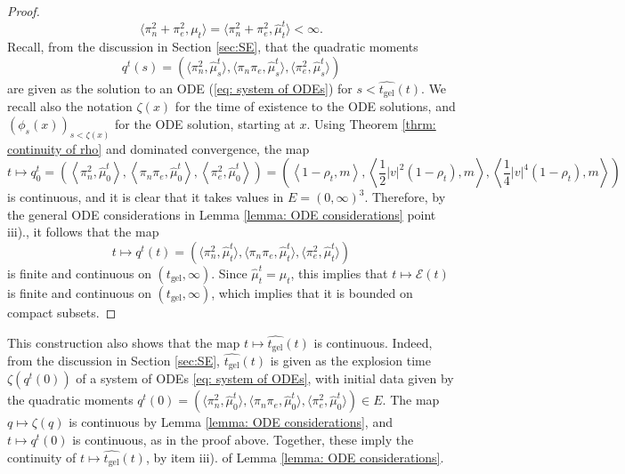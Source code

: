 \begin{proof}
\begin{equation}
   \langle \pi_n^2+ \pi_e^2, \mu_t\rangle = \langle \pi_n^2+\pi_e^2, \widehat{\mu}^t_{t}\rangle <\infty.
\end{equation} Recall, from the discussion in Section \ref{sec:SE}, that the quadratic moments \begin{equation} q^t(s)=\left(\langle \pi_n^2, \widehat{\mu}^t_s\rangle,\langle \pi_n\pi_e, \widehat{\mu}^t_s\rangle,\langle \pi_e^2, \widehat{\mu}^t_s\rangle\right) \end{equation} are given as the solution to an ODE (\ref{eq: system of ODEs}) for $s<\widehat{t_\mathrm{gel}}(t)$. We recall also the notation $\zeta(x)$ for the time of existence to the ODE solutions, and $(\phi_s(x))_{s<\zeta(x)}$ for the ODE solution, starting at $x$. Using Theorem \ref{thrm: continuity of rho} and dominated convergence, the map \begin{equation}
    t\mapsto q^t_0=\left(\left\langle \pi_n^2, \widehat{\mu}^t_0\right\rangle,\left\langle \pi_n\pi_e, \widehat{\mu}^t_0\right\rangle,\left\langle \pi_e^2, \widehat{\mu}^t_0\right\rangle\right)=\left(\left\langle 1-\rho_t,m\right\rangle,\left\langle \frac{1}{2}|v|^2(1-\rho_t),m\right\rangle,\left\langle \frac{1}{4}|v|^4(1-\rho_t),m\right\rangle\right)
\end{equation} is continuous, and it is clear that it takes values in $E=(0,\infty)^3$. Therefore, by the general ODE considerations in Lemma \ref{lemma: ODE considerations} point iii)., it follows that the map \begin{equation}
    t\mapsto q^t(t)= \left(\langle \pi_n^2, \widehat{\mu}^t_t\rangle,\langle \pi_n\pi_e, \widehat{\mu}^t_t\rangle,\langle \pi_e^2, \widehat{\mu}^t_t\rangle\right)
\end{equation} is finite and continuous on $(t_\mathrm{gel}, \infty).$  Since $\widehat{\mu}^t_t=\mu_t$, this implies that $t\mapsto \mathcal{E}(t)$ is finite and continuous on $(t_\mathrm{gel}, \infty)$, which implies that it is bounded on compact subsets. \end{proof}

\begin{remark} This construction also shows that the map $t\mapsto \widehat{t_\mathrm{gel}}(t)$ is continuous. Indeed, from the discussion in Section \ref{sec:SE}, $\widehat{t_\mathrm{gel}}(t)$ is given as the explosion time $\zeta(q^t(0))$ of a system of ODEs \ref{eq: system of ODEs}, with initial data given by the quadratic moments $q^t(0)=(\langle \pi_n^2, \widehat{\mu}^t_0\rangle,\langle \pi_n\pi_e, \widehat{\mu}^t_0\rangle,\langle \pi_e^2, \widehat{\mu}^t_0\rangle) \in E$. The map $q\mapsto \zeta(q)$ is continuous by Lemma \ref{lemma: ODE considerations}, and $t\mapsto q^t(0)$ is continuous, as in the proof above. Together, these imply the continuity of $t\mapsto \widehat{t_\mathrm{gel}}(t)$, by item iii). of Lemma \ref{lemma: ODE considerations}. \end{remark}

